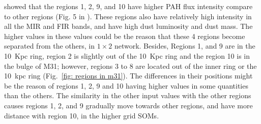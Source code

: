         \cite{Dim15} showed that the regions 1, 2, 9, and 10 have higher PAH flux intensity compare to other regions (Fig. 5 in \cite{Dim15}). 
        These regions also have relatively high intensity in all the MIR and FIR bands, and have high dust luminosity and dust mass.
        The higher values in these values could be the reason that these 4 regions become separated from the others, in $1\times2$ network.
        Besides, Regions 1, and 9 are in the 10~Kpc ring, region 2 is slightly out of the 10~Kpc ring and the region 10 is in the bulge of M31; however, regions 3 to 8 are located out of the inner ring or the 10~kpc ring (Fig.~\ref{fig: regions in m31}).   
        The differences in their positions might be the reason of regions 1, 2, 9 and 10 having higher values in some quantities than the others. 
        The similarity in the other input values with the other regions causes regions 1, 2, and 9 gradually move towards other regions, and have more distance with region 10, in the higher grid SOMs.
        
        
